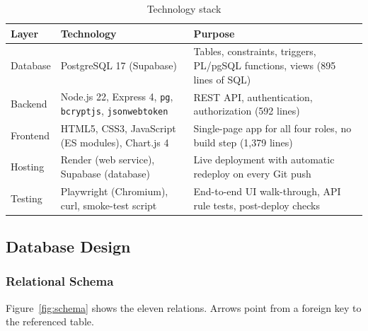 \documentclass[11pt,a4paper]{report}
\begin{document}
\begin{table}[H]
    \centering
    \caption{Technology stack}
    \small
    \begin{tabularx}{\textwidth}{|l|Y|Y|}
        \hline
        \textbf{Layer} & \textbf{Technology} & \textbf{Purpose} \\ \hline
        Database & PostgreSQL 17 (Supabase) & Tables, constraints, triggers, PL/pgSQL functions, views (895 lines of SQL) \\ \hline
        Backend & Node.js 22, Express 4, \texttt{pg}, \texttt{bcryptjs}, \texttt{jsonwebtoken} & REST API, authentication, authorization (592 lines) \\ \hline
        Frontend & HTML5, CSS3, JavaScript (ES modules), Chart.js 4 & Single-page app for all four roles, no build step (1,379 lines) \\ \hline
        Hosting & Render (web service), Supabase (database) & Live deployment with automatic redeploy on every Git push \\ \hline
        Testing & Playwright (Chromium), curl, smoke-test script & End-to-end UI walk-through, API rule tests, post-deploy checks \\ \hline
    \end{tabularx}
\end{table}

\subsection{Database Design}
\subsubsection{Relational Schema}
Figure~\ref{fig:schema} shows the eleven relations. Arrows point from a foreign key to the referenced table.
\end{document}
